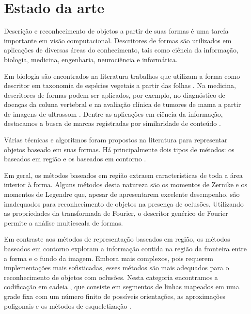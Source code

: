
\section*{Estado da arte}

Descrição e reconhecimento de objetos a partir de suas formas é uma tarefa importante em visão computacional. Descritores de formas são utilizados em aplicações de diversas áreas do conhecimento, tais como ciência da informação, biologia, medicina, engenharia, neurociência e informática. 

Em biologia são encontrados na literatura trabalhos que utilizam a forma como descritor em taxonomia de espécies vegetais a partir das folhas \cite{Fotopoulou:2013, Nam2008245, Wang:2000}. Na medicina, descritores de formas podem ser aplicados, por exemplo, no diagnóstico de doenças da coluna vertebral \cite{Lee:2009} e na avaliação clínica de tumores de mama a partir de imagens de ultrassom \cite{Yang:2009}. Dentre as aplicações em ciência da informação, destacamos a busca de marcas registradas por similaridade de conteúdo \cite{MohdAnuar2013105,Qi20102017}.

Várias técnicas e algoritmos foram propostos na literatura para representar objetos baseado em suas formas. Há principalmente dois tipos de métodos: os baseados em região e os baseados em contorno \cite{Zhang:2004}. 

Em geral, os métodos baseados em região extraem características de toda a área interior à forma. Alguns métodos desta natureza são os momentos de Zernike \cite{Kim:2000} e os momentos de Legendre \cite{Yang:2006} que, apesar de apresentarem excelente desempenho, são inadequados para reconhecimento de objetos na presença de oclusões. Utilizando as propriedades da transformada de Fourier, o descritor genérico de Fourier \cite{Zhang:2002} permite a análise multiescala de formas.

Em contraste aos métodos de representação baseados em região, os métodos baseados em contorno exploram a informação contida na região da fronteira entre a forma e o fundo da imagem. Embora mais complexos, pois requerem implementações mais sofisticadas, esses métodos são mais adequados para o reconhecimento de objetos com oclusões. Nesta categoria encontramos a codificação em cadeia \cite[p~337]{Costa:2009}, que consiste em segmentos de linhas mapeados em uma grade fixa com um número finito de possíveis orientações, as aproximações poligonais \cite[p~340--351]{Costa:2009} e os métodos de esqueletização \cite[p~394--400]{Costa:2009}. 

